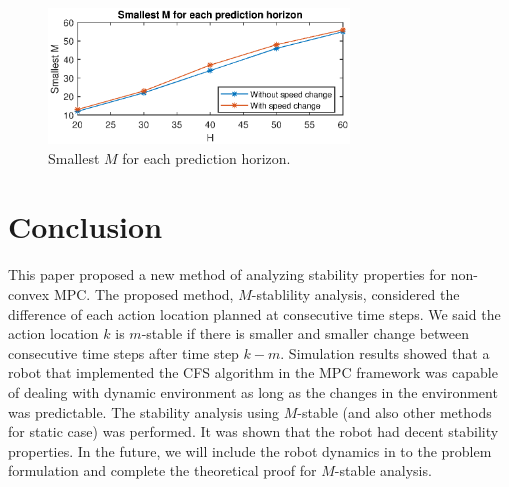 \documentclass{ifacconf}
\begin{document}
\begin{figure}[t]
\begin{center}
\includegraphics[width=8cm]{plot/9.eps}
\caption{Smallest $M$ for each prediction horizon. }
\label{fig:HM}
\end{center}
\end{figure}



\section{Conclusion}

This paper proposed a new method of analyzing stability properties for non-convex MPC. The proposed method, $M$-stablility analysis, considered the difference of each action location planned at consecutive time steps. We said the action location $k$ is $m$-stable  if there is smaller and smaller change between consecutive time steps after time step $k-m$. Simulation  results showed that a robot that implemented the CFS algorithm in the MPC framework was capable of dealing with dynamic environment as long as the changes in the environment was predictable. The stability analysis using $M$-stable (and also other methods for static case) was performed. It was shown that the robot had decent stability properties. In the future, we will include the robot dynamics in to the problem formulation and complete the theoretical proof for $M$-stable analysis.



\end{document}
